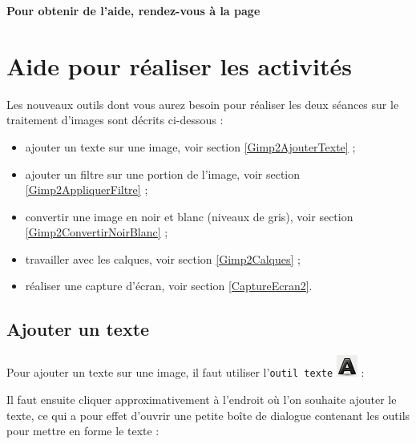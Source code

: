 \textbf{Pour obtenir de l'aide, rendez-vous à la page \pageref{Image5eOutils}}




\newpage

\section{Aide pour réaliser les activités}\label{Image5eOutils}
 
Les nouveaux outils dont vous aurez besoin pour réaliser les deux séances sur le traitement d'images sont décrits ci-dessous :

\begin{itemize}   
\item ajouter un texte sur une image, voir section \vref{Gimp2AjouterTexte} ;
\item ajouter un filtre sur une portion de l'image, voir section \vref{Gimp2AppliquerFiltre} ;
\item convertir une image en noir et blanc (niveaux de gris), voir section \vref{Gimp2ConvertirNoirBlanc} ;
\item travailler avec les calques, voir section \vref{Gimp2Calques} ;   
\item réaliser une capture d'écran, voir section \vref{CaptureEcran2}.
\end{itemize}  



\subsection{Ajouter un texte}\label{Gimp2AjouterTexte}

Pour ajouter un texte sur une image, il faut utiliser l'\texttt{outil texte} \includegraphics[width=.6cm]{./images/image02/iconeTexte} :


Il faut ensuite cliquer approximativement à l'endroit où l'on souhaite ajouter le texte, ce qui a pour effet d'ouvrir une petite boîte de dialogue contenant les outils pour mettre en forme le texte :


